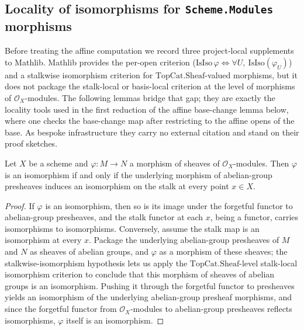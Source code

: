 \subsection{Locality of isomorphisms for \texttt{Scheme.Modules} morphisms}

Before treating the affine computation we record three project-local supplements
to Mathlib. Mathlib provides the per-open criterion
(\(\mathrm{IsIso}\,\varphi \iff \forall U,\ \mathrm{IsIso}(\varphi_U)\)) and a
stalkwise isomorphism criterion for \(\mathrm{TopCat.Sheaf}\)-valued morphisms, but
it does not package the stalk-local or basis-local criterion at the level of
morphisms of \(\mathcal{O}_X\)-modules. The following lemmas bridge that gap; they
are exactly the locality tools used in the first reduction of the affine
base-change lemma below, where one checks the base-change map after restricting to
the affine opens of the base. As bespoke infrastructure they carry no external
citation and stand on their proof sketches.

\begin{lemma}\label{mk-lem:modules_isIso_iff_stalk}
  \leanok

  Let \(X\) be a scheme and \(\varphi : M \to N\) a morphism of sheaves of
  \(\mathcal{O}_X\)-modules. Then \(\varphi\) is an isomorphism if and only if the
  underlying morphism of abelian-group presheaves induces an isomorphism on the
  stalk at every point \(x \in X\).
\end{lemma}

\begin{proof}
  \leanok


If \(\varphi\) is an isomorphism, then so is its image under the forgetful
  functor to abelian-group presheaves, and the stalk functor at each \(x\),
  being a functor, carries isomorphisms to isomorphisms. Conversely, assume the
  stalk map is an isomorphism at every \(x\). Package the underlying abelian-group
  presheaves of \(M\) and \(N\) as sheaves of abelian groups, and \(\varphi\) as a
  morphism of these sheaves; the stalkwise-isomorphism hypothesis lets us apply the
  \(\mathrm{TopCat.Sheaf}\)-level stalk-local isomorphism criterion to conclude that
  this morphism of sheaves of abelian groups is an isomorphism. Pushing it through
  the forgetful functor to presheaves yields an isomorphism of the underlying
  abelian-group presheaf morphisms, and since the forgetful functor from
  \(\mathcal{O}_X\)-modules to abelian-group presheaves reflects isomorphisms,
  \(\varphi\) itself is an isomorphism.
\end{proof}


